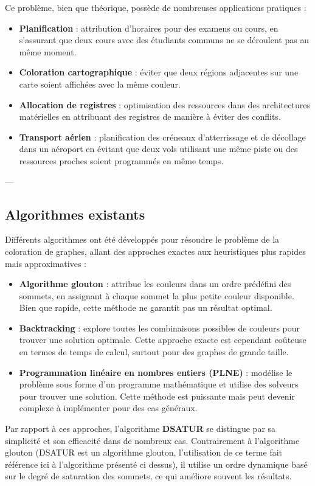 \documentclass[11pt]{article}
\begin{document}
Ce problème, bien que théorique, possède de nombreuses applications pratiques :
\begin{itemize}
    \item \textbf{Planification} : attribution d'horaires pour des examens ou cours, en s'assurant que deux cours avec des étudiants communs ne se déroulent pas au même moment.
    \item \textbf{Coloration cartographique} : éviter que deux régions adjacentes sur une carte soient affichées avec la même couleur.
    \item \textbf{Allocation de registres} : optimisation des ressources dans des architectures matérielles en attribuant des registres de manière à éviter des conflits.
    \item \textbf{Transport aérien} : planification des créneaux d'atterrissage et de décollage dans un aéroport en évitant que deux vols utilisant une même piste ou des ressources proches soient programmés en même temps.
\end{itemize}

---

\subsection{Algorithmes existants}

Différents algorithmes ont été développés pour résoudre le problème de la coloration de graphes, allant des approches exactes aux heuristiques plus rapides mais approximatives :
\begin{itemize}
    \item \textbf{Algorithme glouton} : attribue les couleurs dans un ordre prédéfini des sommets, en assignant à chaque sommet la plus petite couleur disponible. Bien que rapide, cette méthode ne garantit pas un résultat optimal.
    \item \textbf{Backtracking} : explore toutes les combinaisons possibles de couleurs pour trouver une solution optimale. Cette approche exacte est cependant coûteuse en termes de temps de calcul, surtout pour des graphes de grande taille.
    \item \textbf{Programmation linéaire en nombres entiers (PLNE)} : modélise le problème sous forme d'un programme mathématique et utilise des solveurs pour trouver une solution. Cette méthode est puissante mais peut devenir complexe à implémenter pour des cas généraux.
\end{itemize}

Par rapport à ces approches, l'algorithme \textbf{DSATUR} se distingue par sa simplicité et son efficacité dans de nombreux cas. Contrairement à l'algorithme glouton (DSATUR est un algorithme glouton, l'utilisation de ce terme fait référence ici à l'algorithme présenté ci dessus), il utilise un ordre dynamique basé sur le degré de saturation des sommets, ce qui améliore souvent les résultats.
\end{document}
